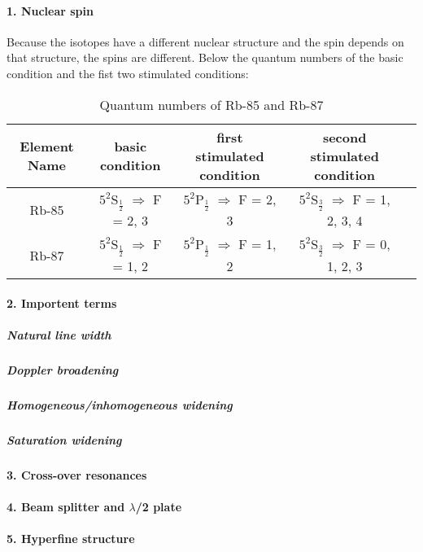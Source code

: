 \paragraph{1. Nuclear spin}
Because the isotopes have a different nuclear structure and the spin depends on that structure, the spins are different. Below the quantum numbers of the basic condition and the fist two stimulated conditions: 
\begin{table}[h]
    \centering
    \begin{tabular}{|c|c|c|c|c|}
        \hline
        Element Name & basic condition & first stimulated condition & second stimulated condition \\
        \hline\hline
        Rb-85 & $5^2$S$_{\frac{1}{2}}$ $\Rightarrow$ F = 2, 3 & $5^2$P$_{\frac{1}{2}}$ $\Rightarrow$ F = 2, 3 & $5^2$S$_{\frac{3}{2}}$ $\Rightarrow$ F = 1, 2, 3, 4 \\
        \hline
        Rb-87 & $5^2$S$_{\frac{1}{2}}$ $\Rightarrow$ F = 1, 2 & $5^2$P$_{\frac{1}{2}}$ $\Rightarrow$ F = 1, 2 & $5^2$S$_{\frac{3}{2}}$ $\Rightarrow$ F = 0, 1, 2, 3 \\
        \hline
    \end{tabular}
    \caption{Quantum numbers of Rb-85 and Rb-87}
\end{table}

\newpage
\paragraph{2. Importent terms}

\subparagraph{Natural line width}

\subparagraph{Doppler broadening}

\subparagraph{Homogeneous/inhomogeneous widening}

\subparagraph{Saturation widening}


\paragraph{3. Cross-over resonances}


\paragraph{4. Beam splitter and $\lambda$/2 plate}


\paragraph{5. Hyperfine structure}